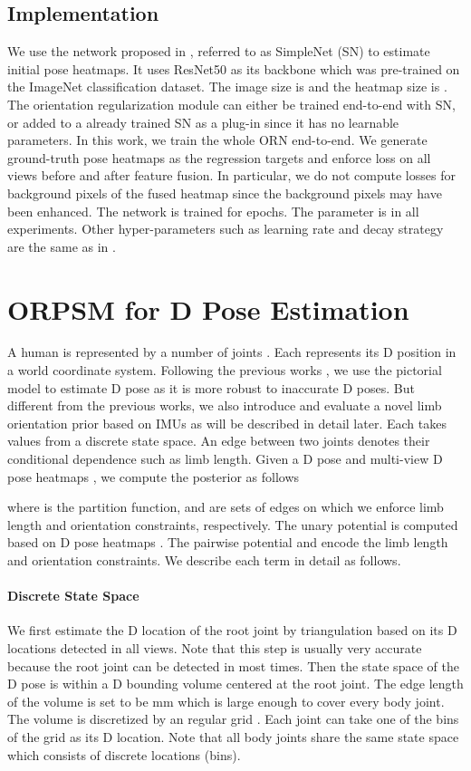 \documentclass[10pt,twocolumn,letterpaper]{article}
\begin{document}
\subsection{Implementation}
We use the network proposed in \cite{simplebaselines}, referred to as SimpleNet (SN) to estimate initial pose heatmaps. It uses ResNet50 \cite{he2016deep} as its backbone which was pre-trained on the ImageNet classification dataset. The image size is  and the heatmap size is . 
The orientation regularization module can either be trained end-to-end with SN, or added to a already trained SN as a plug-in since it has no learnable parameters. In this work, we train the whole ORN end-to-end.
We generate ground-truth pose heatmaps as the regression targets and enforce  loss on all views before and after feature fusion. In particular, we do not compute losses for background pixels of the fused heatmap since the background pixels may have been enhanced.
The network is trained for  epochs. The parameter  is  in all experiments. Other hyper-parameters such as learning rate and decay strategy are the same as in \cite{simplebaselines}. 


\section{ORPSM for D Pose Estimation}
A human is represented by a number of joints . Each  represents its D position in a world coordinate system. Following the previous works \cite{kostrikov2014depth,PavlakosZDD17,belagiannis20143D,qiu2019cross}, we use the pictorial model to estimate D pose as it is more robust to inaccurate D poses. But different from the previous works, we also introduce and evaluate a novel limb orientation prior based on IMUs as will be described in detail later. Each  takes values from a discrete state space. An edge between two joints denotes their conditional dependence such as limb length. Given a D pose  and multi-view D pose heatmaps , we compute the posterior as follows

where  is the partition function,  and  are sets of edges on which we enforce limb length and orientation constraints, respectively. The unary potential  is computed based on D pose heatmaps . The pairwise potential  and  encode the limb length and orientation constraints. We describe each term in detail as follows.



\paragraph{Discrete State Space} We first estimate the D location of the root joint by triangulation based on its D locations detected in all views. Note that this step is usually very accurate because the root joint can be detected in most times. Then the state space of the D pose is within a D bounding volume centered at the root joint. The edge length of the volume is set to be mm which is large enough to cover every body joint. The volume is discretized by an  regular grid . Each joint can take one of the bins of the grid as its D location. Note that all body joints share the same state space  which consists of  discrete locations (bins).
\end{document}
